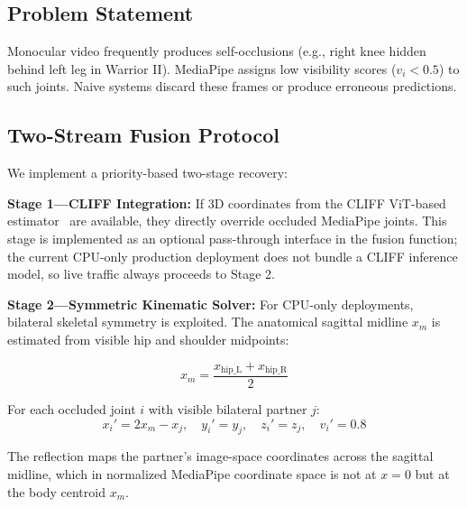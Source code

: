 \documentclass[conference]{IEEEtran}
\begin{document}
\subsection{Problem Statement}

Monocular video frequently produces self-occlusions (e.g., right knee hidden behind left
leg in Warrior II). MediaPipe assigns low visibility scores ($v_i < 0.5$) to such joints.
Naive systems discard these frames or produce erroneous predictions.

\subsection{Two-Stream Fusion Protocol}

We implement a priority-based two-stage recovery:

\noindent\textbf{Stage 1---CLIFF Integration:} If 3D coordinates from the CLIFF
ViT-based estimator~\cite{cliff2022} are available, they directly override occluded
MediaPipe joints. This stage is implemented as an optional pass-through interface
in the fusion function; the current CPU-only production deployment does not bundle
a CLIFF inference model, so live traffic always proceeds to Stage 2.

\noindent\textbf{Stage 2---Symmetric Kinematic Solver:} For CPU-only deployments,
bilateral skeletal symmetry is exploited. The anatomical sagittal midline $x_m$ is
estimated from visible hip and shoulder midpoints:

\begin{equation}
x_m = \frac{x_{\mathrm{hip\_L}} + x_{\mathrm{hip\_R}}}{2}
\label{eq:midline}
\end{equation}

\noindent For each occluded joint $i$ with visible bilateral partner $j$:
\begin{equation}
x_i' = 2x_m - x_j,\quad y_i' = y_j,\quad z_i' = z_j,\quad v_i' = 0.8
\label{eq:mirror}
\end{equation}

\noindent The reflection maps the partner's image-space coordinates across the sagittal
midline, which in normalized MediaPipe coordinate space is not at $x=0$ but at the
body centroid $x_m$.
\end{document}
